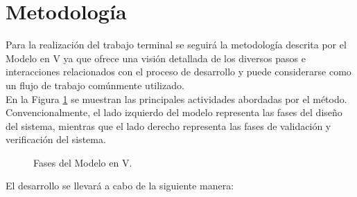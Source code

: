 \section{Metodología}
Para la realización del trabajo terminal se seguirá la metodología descrita por el Modelo en V ya que ofrece una visión detallada de los diversos pasos e interacciones relacionados con el proceso de desarrollo y puede considerarse como un flujo de trabajo comúnmente utilizado. \cite{perez2006V} \\

En la Figura \ref{fig:IntroduccionMetodologia} se muestran las principales actividades abordadas por el método. Convencionalmente, el lado izquierdo del modelo representa las fases del diseño del sistema, mientras que el lado derecho representa las fases de validación y verificación del sistema. \\

\begin{figure}[htbp!]
	\centering
	\caption{Fases del Modelo en V.}
	\label{fig:IntroduccionMetodologia}
\end{figure}

El desarrollo se llevará a cabo de la siguiente manera: \\

